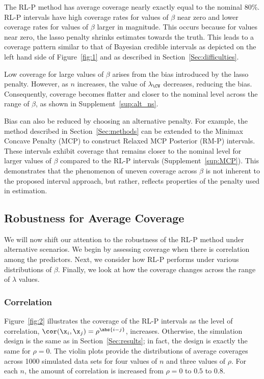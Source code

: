 The RL-P method has average coverage nearly exactly equal to the nominal 80\%. RL-P intervals have high coverage rates for values of $\beta$ near zero and lower coverage rates for values of $\beta$ larger in magnitude. This occurs because for values near zero, the lasso penalty shrinks estimates towards the truth. This leads to a coverage pattern similar to that of Bayesian credible intervals as depicted on the left hand side of Figure~\ref{fig:1} and as described in Section~\ref{Sec:difficulties}.

Low coverage for large values of $\beta$ arises from the bias introduced by the lasso penalty. However, as $n$ increases, the value of $\lambda_{\CV}$ decreases, reducing the bias. Consequently, coverage becomes flatter and closer to the nominal level across the range of $\beta$, as shown in Supplement~\ref{sup:alt_ns}.

Bias can also be reduced by choosing an alternative penalty. For example, the method described in Section~\ref{Sec:methods} can be extended to the Minimax Concave Penalty (MCP) to construct Relaxed MCP Posterior (RM-P) intervals. These intervals exhibit coverage that remains closer to the nominal level for larger values of $\beta$ compared to the RL-P intervals (Supplement~\ref{sup:MCP}). This demonstrates that the phenomenon of uneven coverage across $\beta$ is not inherent to the proposed interval approach, but rather, reflects properties of the penalty used in estimation.

\subsection{Robustness for Average Coverage}
\label{Sec:robustness}

We will now shift our attention to the robustness of the RL-P method under alternative scenarios. We begin by assessing coverage when there is correlation among the predictors. Next, we consider how RL-P performs under various distributions of $\beta$. Finally, we look at how the coverage changes across the range of $\lambda$ values.

\subsubsection{Correlation}
\label{Sec:correlation}

Figure~\ref{fig:2} illustrates the coverage of the RL-P intervals as the level of correlation, $\cor(\x_i, \x_j) = \rho^{\abs{i-j}}$, increases. Otherwise, the simulation design is the same as in Section~\ref{Sec:results}; in fact, the design is exactly the same for $\rho = 0$. The violin plots provide the distributions of average coverages across 1000 simulated data sets for four values of $n$ and three values of $\rho$. For each $n$, the amount of correlation is increased from $\rho = 0$ to $0.5$ to $0.8$.

